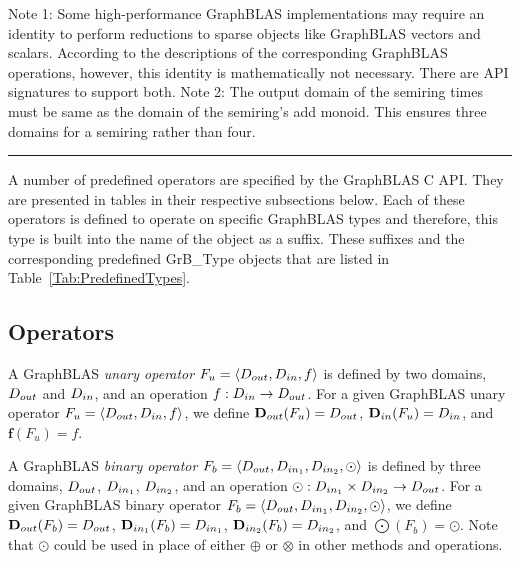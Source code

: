 \begin{table}
\begin{center}
    \end{center}

        {\footnotesize Note 1: Some high-performance GraphBLAS implementations may require 
        an identity to perform reductions to sparse objects like GraphBLAS vectors 
        and scalars. According to the descriptions of the corresponding GraphBLAS operations, 
        however, this identity is mathematically not necessary.  There are API signatures to
        support both.\newline
        Note 2: The output domain of the semiring times must be same as the domain of the 
        semiring's add monoid. This ensures three domains for a semiring rather than four.}

    \hrule
\end{table}


A number of predefined operators are specified by the GraphBLAS C API.  They
are presented in tables in their respective subsections below. Each of these 
operators is defined to operate on specific GraphBLAS types and therefore, 
this type is built into the name of the object as a suffix.  These suffixes 
and the corresponding predefined {\sf GrB\_Type} objects that are listed in 
Table~\ref{Tab:PredefinedTypes}.

\subsection{Operators}

A GraphBLAS \emph{unary operator} $F_u = \langle \mbox{$D_{out}$}, \mbox{$D_{in}$}, f\rangle$
is defined by two domains, $\mbox{$D_{out}$}$ and $\mbox{$D_{in}$}$, and an operation
$f: \mbox{$D_{in}$} \rightarrow \mbox{$D_{out}$}$.  For a given GraphBLAS unary operator
$F_u=\langle \mbox{$D_{out}$}, \mbox{$D_{in}$}, f \rangle$, we define $\mbox{$\mathbf{D}_{out}$}(F_u) = \mbox{$D_{out}$}$, 
$\mbox{$\mathbf{D}_{in}$}(F_u) = \mbox{$D_{in}$}$, and $\mathbf{f}(F_u) = f$.

A GraphBLAS \emph{binary operator} $F_b = \langle \mbox{$D_{out}$}, \mbox{$D_{in_{1}}$}, \mbox{$D_{in_{2}}$}, 
\odot \rangle$
is defined by three domains, $\mbox{$D_{out}$}$, $\mbox{$D_{in_{1}}$}$, $\mbox{$D_{in_{2}}$}$, and an operation
$\odot: \mbox{$D_{in_{1}}$} \times \mbox{$D_{in_{2}}$} \rightarrow \mbox{$D_{out}$}$.  For a given GraphBLAS binary operator
$F_b=\langle \mbox{$D_{out}$}, \mbox{$D_{in_{1}}$}, \mbox{$D_{in_{2}}$}, \odot \rangle$, we define $\mbox{$\mathbf{D}_{out}$}(F_b) = \mbox{$D_{out}$}$,
$\mbox{$\mathbf{D}_{in_{1}}$}(F_b) = \mbox{$D_{in_{1}}$}$, $\mbox{$\mathbf{D}_{in_{2}}$}(F_b) = \mbox{$D_{in_{2}}$}$, and $\mathbf{\bigodot}(F_b)
= \odot$.  Note that $\odot$ could be used in place of either $\oplus$ or 
$\otimes$ in other methods and operations. 

